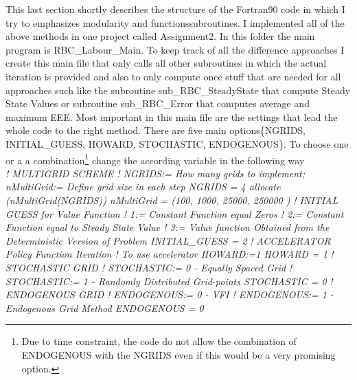 \documentclass[a4paper,12pt]{article}
\begin{document}
This last section shortly describes the structure of the Fortran90 code in which I try to emphasizes modularity and functions\/subroutines. I implemented all of the above methods in one project called Assignment2. In this folder the main program is RBC\_Labour\_Main. To keep track of all the difference approaches I create this main file that only calls all other subroutines in which the actual iteration is provided and also to only compute once stuff that are needed for all approaches such like the subroutine sub\_RBC\_SteadyState that compute Steady State Values or subroutine sub\_RBC\_Error that computes average and maximum EEE. Most important in this main file are the settings that lead the whole code to the right method. There are five main options\{NGRIDS, INITIAL\_GUESS, HOWARD, STOCHASTIC, ENDOGENOUS\}. To choose one or a a combination\footnote{
Due to time constraint, the code do not allow the combination of ENDOGENOUS with the NGRIDS even if this would be a very promising option.}
change the according variable in the following way \vspace*{0.5cm} \\ 
\textit{! MULTIGRID SCHEME \newline
! NGRIDS:= How many grids to implement; nMultiGrid:= Define grid size in each step\newline
NGRIDS = 4\newline
allocate (nMultiGrid(NGRIDS))\newline
nMultiGrid = (\/100, 1000, 25000, 250000 \/)}\vspace*{0.5cm}
\textit{! INITIAL GUESS for Value Function\newline
! 1:= Constant Function equal Zeros\newline
! 2:= Constant Function equal to Steady State Value\newline
! 3:= Value function Obtained from the Deterministic Version of Problem\newline
INITIAL\_GUESS = 2}\vspace*{0.5cm}
\textit{! ACCELERATOR \- Policy Function Iteration\newline
! To use accelerator HOWARD:=1\newline
HOWARD = 1}\vspace*{0.5cm}
\textit{! STOCHASTIC GRID\newline
! STOCHASTIC:= 0 - Equally Spaced Grid\newline
! STOCHASTIC:= 1 - Randomly Distributed Grid-points \newline
STOCHASTIC = 0}\vspace*{0.5cm}
\textit{! ENDOGENOUS GRID\newline
! ENDOGENOUS:= 0 - VFI\newline
! ENDOGENOUS:= 1 - Endogenous Grid Method\newline
ENDOGENOUS = 0}\vspace*{0.5cm}
\end{document}
